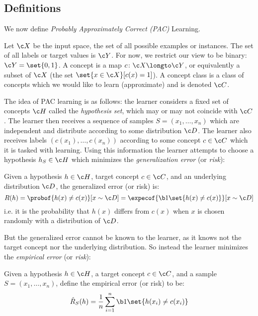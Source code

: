 \subsection{Definitions}

We now define {\it Probably Approximately Correct (PAC)} Learning.

\bdefn

    Let $\c X$ be the {\emphcolor input space}, the set of all possible examples or instances.
    The set of all {\emphcolor labels} or {\emphcolor target values} is $\c Y$.
    For now, we restrict our view to be binary: $\c Y=\set{0,1}$.
    A {\emphcolor concept} is a map $c\colon\c X\longto\c Y$, or equivalently a subset of $\c X$ (the set $\set{x\in\c X}[c(x)=1]$).
    A {\emphcolor concept class} is a class of concepts which we would like to learn (approximate) and is denoted $\c C$.

\edefn

The idea of PAC learning is as follows: the learner considers a fixed set of concepts $\c H$ called the {\it hypothesis set}, which may or may not coincide with $\c C$.
The learner then receives a sequence of samples $S=(x_1,\dots,x_n)$ which are independent and distribute according to some distribution $\c D$.
The learner also receives labels $(c(x_1),\dots,c(x_n))$ according to some concept $c\in\c C$ which it is tasked with learning.
Using this information the learner attempts to choose a hypothesis $h_S\in\c H$ which minimizes the {\it generalization error} (or {\it risk}):

\bdefn

    Given a hypothesis $h\in\c H$, target concept $c\in\c C$, and an underlying distribution $\c D$, the {\emphcolor generalized error} (or {\emphcolor risk}) is:
    $$ R(h) = \probof{h(x)\neq c(x)}[x\sim\c D] = \expecof{\b1\set{h(x)\neq c(x)}}[x\sim\c D] $$
    i.e. it is the probability that $h(x)$ differs from $c(x)$ when $x$ is chosen randomly with a distribution of $\c D$.

\edefn

But the generalized error cannot be known to the learner, as it knows not the target concept nor the underlying distribution.
So instead the learner minimizes the {\it empirical error} (or {\it risk}):

\bdefn

    Given a hypothesis $h\in\c H$, a target concept $c\in\c C$, and a sample $S=(x_1,\dots,x_n)$, define the {\emphcolor empirical error} (or {\emphcolor risk}) to be:
    $$ \hat R_S(h) = \frac1n\sum_{i=1}^n\b1\set{h(x_i)\neq c(x_i)} $$

